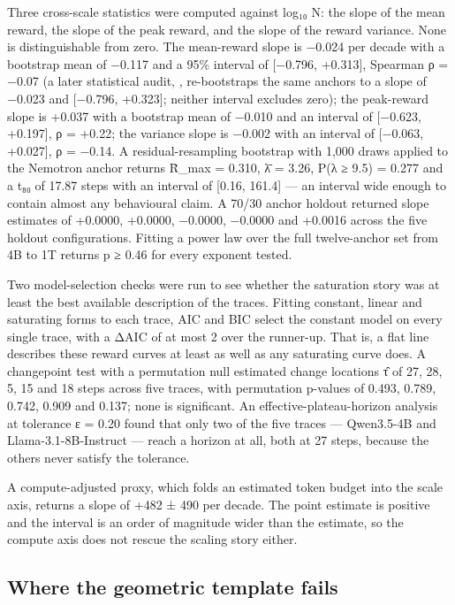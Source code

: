 \documentclass[12pt,a4paper]{report}
\newcommand{\longtok}[1]{\texttt{\seqsplit{#1}}}
\begin{document}
Three cross-scale statistics were computed against log₁₀ N: the slope of
the mean reward, the slope of the peak reward, and the slope of the
reward variance. None is distinguishable from zero. The mean-reward
slope is −0.024 per decade with a bootstrap mean of −0.117 and a 95\%
interval of {[}−0.796, +0.313{]}, Spearman ρ = −0.07 (a later
statistical audit,
\longtok{results/berkeley/adding\_\allowbreak{}error\_\allowbreak{}bars\_\allowbreak{}summary.json},
re-bootstraps the same anchors to a slope of −0.023 and {[}−0.796,
+0.323{]}; neither interval excludes zero); the peak-reward slope is
+0.037 with a bootstrap mean of −0.010 and an interval of {[}−0.623,
+0.197{]}, ρ = +0.22; the variance slope is −0.002 with an interval of
{[}−0.063, +0.027{]}, ρ = −0.14. A residual-resampling bootstrap with
1,000 draws applied to the Nemotron anchor returns R̄\_max = 0.310, λ̄ =
3.26, P(λ ≥ 9.5) = 0.277 and a t₈₀ of 17.87 steps with an interval of
{[}0.16, 161.4{]} --- an interval wide enough to contain almost any
behavioural claim. A 70/30 anchor holdout returned slope estimates of
+0.0000, +0.0000, −0.0000, −0.0000 and +0.0016 across the five holdout
configurations. Fitting a power law over the full twelve-anchor set from
4B to 1T returns p ≥ 0.46 for every exponent tested.

Two model-selection checks were run to see whether the saturation story
was at least the best available description of the traces. Fitting
constant, linear and saturating forms to each trace, AIC and BIC select
the constant model on every single trace, with a ΔAIC of at most 2 over
the runner-up. That is, a flat line describes these reward curves at
least as well as any saturating curve does. A changepoint test with a
permutation null estimated change locations τ̂ of 27, 28, 5, 15 and 18
steps across five traces, with permutation p-values of 0.493, 0.789,
0.742, 0.909 and 0.137; none is significant. An
effective-plateau-horizon analysis at tolerance ε = 0.20 found that only
two of the five traces --- Qwen3.5-4B and Llama-3.1-8B-Instruct ---
reach a horizon at all, both at 27 steps, because the others never
satisfy the tolerance.

A compute-adjusted proxy, which folds an estimated token budget into the
scale axis, returns a slope of +482 ± 490 per decade. The point estimate
is positive and the interval is an order of magnitude wider than the
estimate, so the compute axis does not rescue the scaling story either.

\subsection{Where the geometric template
fails}\label{where-the-geometric-template-fails}
\end{document}
